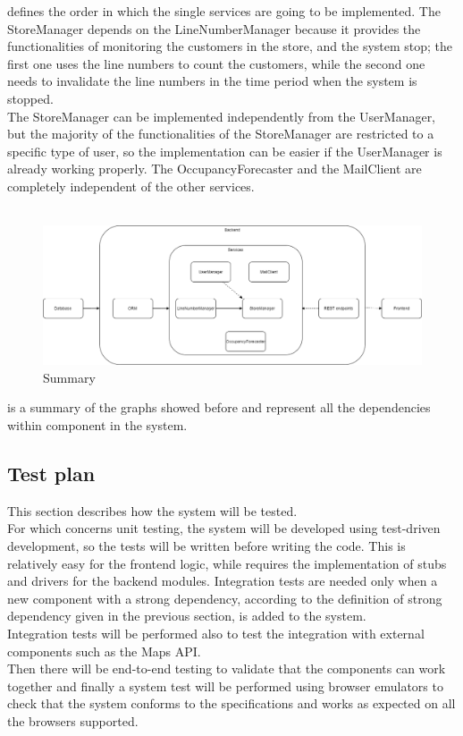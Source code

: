  defines the order in which the single services are going to be implemented.
The StoreManager depends on the LineNumberManager because it provides the functionalities of monitoring the customers in the store, and the
system stop;
the first one uses the line numbers to count the customers, while the second one needs to invalidate the line numbers
in the time period when the system is stopped.\\
The StoreManager can be implemented independently from the UserManager, but the majority of the functionalities of the StoreManager
are restricted to a specific type of user, so the implementation can be easier if the UserManager is already working properly.
The OccupancyForecaster and the MailClient are completely independent of the other services.\\
\\
\begin{figure}[H]
    \centering
    \includegraphics[height=0.4\textwidth]{Images/IntegrationAndTestingPlan/Summary.png}
    \caption{Summary}
    \label{fig:Summary}
\end{figure}
 is a summary of the graphs showed before and represent all the dependencies within component in the system.

\subsection{Test plan}
This section describes how the system will be tested. \\
For which concerns unit testing, the system will be developed using test-driven development, so the tests will be written before writing the code.
This is relatively easy for the frontend logic, while requires the implementation of stubs and drivers for the backend modules.
Integration tests are needed only when a new component with a strong dependency, according to the definition of strong dependency
given in the previous section, is added to the system. \\
Integration tests will be performed also to test the integration with external components such as the Maps API. \\
Then there will be end-to-end testing to validate that the components can work together and finally a system test will be performed
using browser emulators to check that the system conforms to the specifications and works as expected on all the browsers supported.
